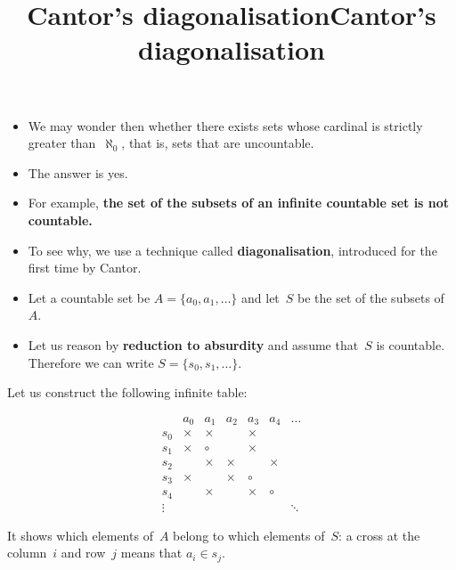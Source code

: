 \documentclass[wide]{slides}
\begin{document}
\begin{slide}
  \title{Cantor's diagonalisation}

  \begin{itemize}

    \item We may wonder then whether there exists sets whose cardinal
      is strictly greater than~$\aleph_0$, that is, sets that are
      uncountable.

    \item The answer is yes.

    \item For example, \textbf{the set of the subsets of an infinite
      countable set is not countable.}

    \item To see why, we use a technique called
      \textbf{diagonalisation}, introduced for the first time by
      Cantor.

    \item Let a countable set be $A = \{a_0, a_1, \ldots\}$ and
      let~$S$ be the set of the subsets of~$A$.

    \item Let us reason by \textbf{reduction to absurdity} and assume
      that~$S$ is countable. Therefore we can write $S = \{s_0, s_1,
      \ldots\}$.
  \end{itemize}

\end{slide}

\begin{slide}
  \title{Cantor's diagonalisation}

  Let us construct the following infinite table:

  \bigskip

  \begin{equation*}
    \begin{array}{c|cccccc}
      & a_0    & a_1    & a_2    & a_3   & a_4      & \ldots\\
      \hline
      s_0    & \times & \times &        & \times \\
      s_1    & \times & \circ  &        & \times \\
      s_2    &        & \times & \times &        & \times\\
      s_3    & \times &        & \times & \circ  & \\
      s_4    &        & \times &        & \times & \circ\\
      \vdots &        &        &        &        &         & \ddots
    \end{array}
  \end{equation*}

  \bigskip

  It shows which elements of~$A$ belong to which elements of~$S$: a
  cross at the column~$i$ and row~$j$ means that $a_i \in s_j$.

\end{slide}
\end{document}

